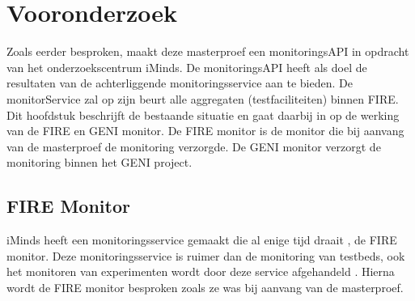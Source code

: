 \chapter{Vooronderzoek}
{\samenvatting
Zoals eerder besproken, maakt deze masterproef een monitoringsAPI in opdracht van het onderzoekscentrum iMinds. De monitoringsAPI heeft als doel de resultaten van de achterliggende monitoringsservice aan te bieden. De monitorService zal op zijn beurt alle aggregaten (testfaciliteiten) binnen FIRE. Dit hoofdstuk beschrijft de bestaande situatie en gaat daarbij in op de werking van de FIRE en GENI monitor. De FIRE monitor is de monitor die bij aanvang van de masterproef de monitoring verzorgde. De GENI monitor verzorgt de monitoring binnen het GENI project.}
\section{FIRE Monitor}
\npar
iMinds heeft een monitoringsservice gemaakt die al enige tijd draait \citep{fed4fire-second-fed-arch}, de FIRE monitor. Deze monitoringsservice is ruimer dan de monitoring van testbeds, ook het monitoren van experimenten wordt door deze service afgehandeld \citep{fed4fire-second-fed-arch}. Hierna wordt de FIRE monitor besproken zoals ze was bij aanvang van de masterproef.


